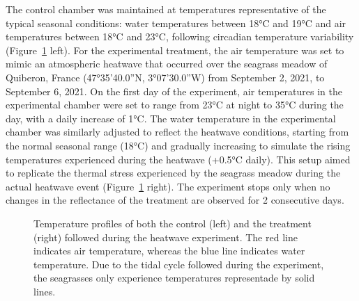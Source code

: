 \documentclass[
  number]{elsarticle}
\begin{document}
The control chamber was maintained at temperatures representative of the
typical seasonal conditions: water temperatures between 18°C and 19°C
and air temperatures between 18°C and 23°C, following circadian
temperature variability (Figure~\ref{fig-Profile} left). For the
experimental treatment, the air temperature was set to mimic an
atmospheric heatwave that occurred over the seagrass meadow of Quiberon,
France (47°35'40.0''N, 3°07'30.0''W) from September 2, 2021, to
September 6, 2021. On the first day of the experiment, air temperatures
in the experimental chamber were set to range from 23°C at night to 35°C
during the day, with a daily increase of 1°C. The water temperature in
the experimental chamber was similarly adjusted to reflect the heatwave
conditions, starting from the normal seasonal range (18°C) and gradually
increasing to simulate the rising temperatures experienced during the
heatwave (+0.5°C daily). This setup aimed to replicate the thermal
stress experienced by the seagrass meadow during the actual heatwave
event (Figure~\ref{fig-Profile} right). The experiment stops only when
no changes in the reflectance of the treatment are observed for 2
consecutive days.

\label{cell-fig-Profile}
\begin{figure}[H]


\caption{\label{fig-Profile}Temperature profiles of both the control
(left) and the treatment (right) followed during the heatwave
experiment. The red line indicates air temperature, whereas the blue
line indicates water temperature. Due to the tidal cycle followed during
the experiment, the seagrasses only experience temperatures representade
by solid lines.}

\end{figure}%
\end{document}
